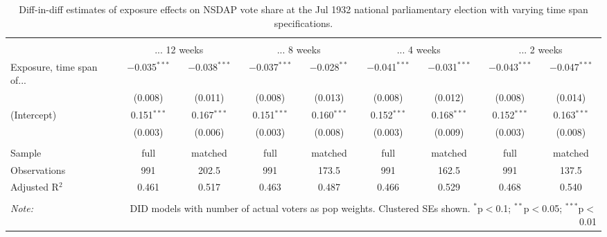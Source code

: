 
\begin{table}[!htbp] \centering 
  \caption{Diff-in-diff estimates of exposure effects on NSDAP vote share at the Jul 1932 national parliamentary election with varying time span specifications.\vspace{-.25cm}} 
  \label{tab:nsdap-voteshare-timespan-dd-1932-1} 
\scriptsize 
\begin{tabular}{@{\extracolsep{5pt}}lcccccccc} 
\\[-1.8ex]\hline 
\hline \\[-1.8ex] 
 & \multicolumn{2}{c}{... 12 weeks} & \multicolumn{2}{c}{... 8 weeks} & \multicolumn{2}{c}{... 4 weeks} & \multicolumn{2}{c}{... 2 weeks} \\ 
 \cmidrule(r){2-3}\cmidrule(r){4-5}\cmidrule(r){6-7}\cmidrule(r){8-9}Exposure, time span of... & $-$0.035$^{***}$ & $-$0.038$^{***}$ & $-$0.037$^{***}$ & $-$0.028$^{**}$ & $-$0.041$^{***}$ & $-$0.031$^{***}$ & $-$0.043$^{***}$ & $-$0.047$^{***}$ \\ 
  & (0.008) & (0.011) & (0.008) & (0.013) & (0.008) & (0.012) & (0.008) & (0.014) \\ 
  (Intercept) & 0.151$^{***}$ & 0.167$^{***}$ & 0.151$^{***}$ & 0.160$^{***}$ & 0.152$^{***}$ & 0.168$^{***}$ & 0.152$^{***}$ & 0.163$^{***}$ \\ 
  & (0.003) & (0.006) & (0.003) & (0.008) & (0.003) & (0.009) & (0.003) & (0.008) \\ 
 \hline \\[-1.8ex] 
Sample & full & matched & full & matched & full & matched & full & matched \\ 
Observations & 991 & 202.5 & 991 & 173.5 & 991 & 162.5 & 991 & 137.5 \\ 
Adjusted R$^{2}$ & 0.461 & 0.517 & 0.463 & 0.487 & 0.466 & 0.529 & 0.468 & 0.540 \\ 
\hline 
\hline \\[-1.8ex] 
\textit{Note:}  & \multicolumn{8}{r}{DID models with number of actual voters as pop weights. Clustered SEs shown. $^{*}$p$<$0.1; $^{**}$p$<$0.05; $^{***}$p$<$0.01} \\ 
\end{tabular} 
\end{table} 
